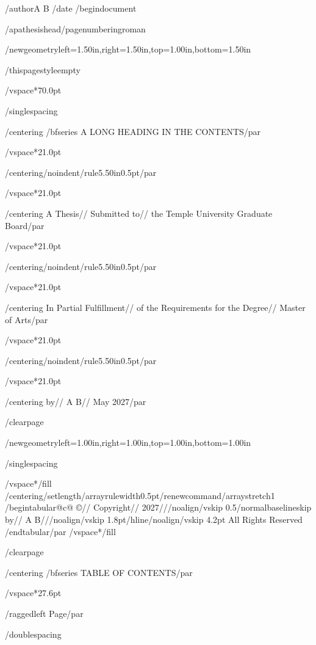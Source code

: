 /author{A B}
/date{}
/begin{document}


/apathesishead/pagenumbering{roman}

/newgeometry{left=1.50in,right=1.50in,top=1.00in,bottom=1.50in}

/thispagestyle{empty}

/vspace*{70.0pt}

/singlespacing

{/centering
/bfseries A LONG HEADING IN THE CONTENTS/par}

/vspace*{21.0pt}

{/centering/noindent/rule{5.50in}{0.5pt}/par}

/vspace*{21.0pt}

{/centering
A Thesis//
Submitted to//
the Temple University Graduate Board/par}

/vspace*{21.0pt}

{/centering/noindent/rule{5.50in}{0.5pt}/par}

/vspace*{21.0pt}

{/centering
In Partial Fulfillment//
of the Requirements for the Degree//
Master of Arts/par}

/vspace*{21.0pt}

{/centering/noindent/rule{5.50in}{0.5pt}/par}

/vspace*{21.0pt}

{/centering
by//
A B//
May 2027/par}

/clearpage

/newgeometry{left=1.00in,right=1.00in,top=1.00in,bottom=1.00in}

/singlespacing

/vspace*{/fill}
{/centering/setlength{/arrayrulewidth}{0.5pt}/renewcommand{/arraystretch}{1}
/begin{tabular}{@{}c@{}}
©//
Copyright//
2027///noalign{/vskip 0.5/normalbaselineskip}
by//
A B///noalign{/vskip 1.8pt}/hline/noalign{/vskip 4.2pt}
All Rights Reserved
/end{tabular}/par}
/vspace*{/fill}

/clearpage

{/centering
/bfseries TABLE OF CONTENTS/par}

/vspace*{27.6pt}

{/raggedleft
Page/par}

/doublespacing

